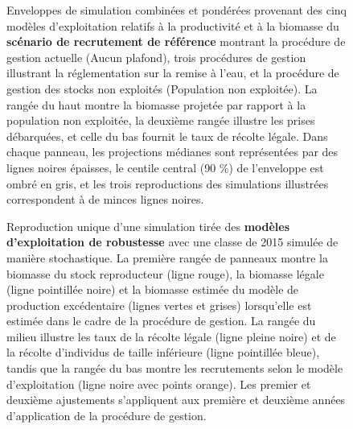 \documentclass[11pt]{book}
\begin{document}
\begin{turn}
\begin{figure}[htb]
{}

\caption{Enveloppes de simulation combinées et pondérées provenant des cinq modèles d’exploitation relatifs à la productivité et à la biomasse du \textbf{scénario de recrutement de référence} montrant la procédure de gestion actuelle (Aucun plafond), trois procédures de gestion illustrant la réglementation sur la remise à l’eau, et la procédure de gestion des stocks non exploités (Population non exploitée). La rangée du haut montre la biomasse projetée par rapport à la population non exploitée, la deuxième rangée illustre les prises débarquées, et celle du bas fournit le taux de récolte légale. Dans chaque panneau, les projections médianes sont représentées par des lignes noires épaisses, le centile central (90 \%) de l’enveloppe est ombré en gris, et les trois reproductions des simulations illustrées correspondent à de minces lignes noires.}\label{fig:unnamed-chunk-24}
\end{figure}
\newpage
\begin{figure}[htb]

{\centering {} 

}

\caption{Reproduction unique d’une simulation tirée des \textbf{modèles d’exploitation de robustesse} avec une classe de 2015 simulée de manière stochastique. La première rangée de panneaux montre la biomasse du stock reproducteur (ligne rouge), la biomasse légale (ligne pointillée noire) et la biomasse estimée du modèle de production excédentaire (lignes vertes et grises) lorsqu’elle est estimée dans le cadre de la procédure de gestion. La rangée du milieu illustre les taux de la récolte légale (ligne pleine noire) et de la récolte d’individus de taille inférieure (ligne pointillée bleue), tandis que la rangée du bas montre les recrutements selon le modèle d’exploitation (ligne noire avec points orange). Les premier et deuxième ajustements s’appliquent aux première et deuxième années d’application de la procédure de gestion.}\label{fig:unnamed-chunk-25}
\end{figure}


\end{turn}
\end{document}
